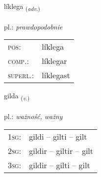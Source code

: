 \documentclass[frontgrid, backgrid]{flacards}\usepackage[]{graphicx}\usepackage[]{xcolor}
\begin{document}
\renewcommand{\flhead}{\vskip5pt \fboxsep=0pt {\small\bfseries\footnotesize Atviksorð | Adverb}}
\renewcommand{\fcfoot}{\vskip5pt \fboxsep=0pt \hspace{2pt}{\small\bfseries\footnotesize 1K}}

\renewcommand{\blhead}{\vskip5pt {\small\bfseries\footnotesize Atviksorð | Adverb }}
\renewcommand{\bcfoot}{\vskip5pt \hspace{2pt}{\small\bfseries\footnotesize 1K}}


{líklega \small{\textsubscript{(\textit{adv.})}} \\[1ex] %
\textphonetic{[lihklɛɣa]} \\
pl.: \emph{prawdopodobnie} \\  [2ex]
\renewcommand*{\arraystretch}{0.8}
\begin{tabular}{ll}
\textsc{pos}: & líklega \\ 
\textsc{comp.}: & líklegar \\ 
\textsc{superl.}: & líklegast \\
\end{tabular}
}

\renewcommand{\flhead}{\vskip5pt \fboxsep=0pt {\small\bfseries\footnotesize Sagnorð | Verb}}
\renewcommand{\fcfoot}{\vskip5pt \fboxsep=0pt \hspace{2pt}{\small\bfseries\footnotesize 1K}}

\renewcommand{\blhead}{\vskip5pt {\small\bfseries\footnotesize Sagnorð | Verb }}
\renewcommand{\bcfoot}{\vskip5pt \hspace{2pt}{\small\bfseries\footnotesize 1K}}


{gilda \small{\textsubscript{(\textit{v.})}} \\[1ex] %
\textphonetic{[cɪlta]} \\
pl.: \emph{ważność, ważny} \\  [2ex]
\renewcommand*{\arraystretch}{0.8}
\begin{tabular}{p{1cm}l}
\textsc{1sg}: & gildi -- gilti -- gilt \\ 
\textsc{2sg}: & gildir -- giltir -- gilt \\ 
\textsc{3sg}: & gildir -- gilti -- gilt \\ 
\end{tabular}
}
\end{document}
